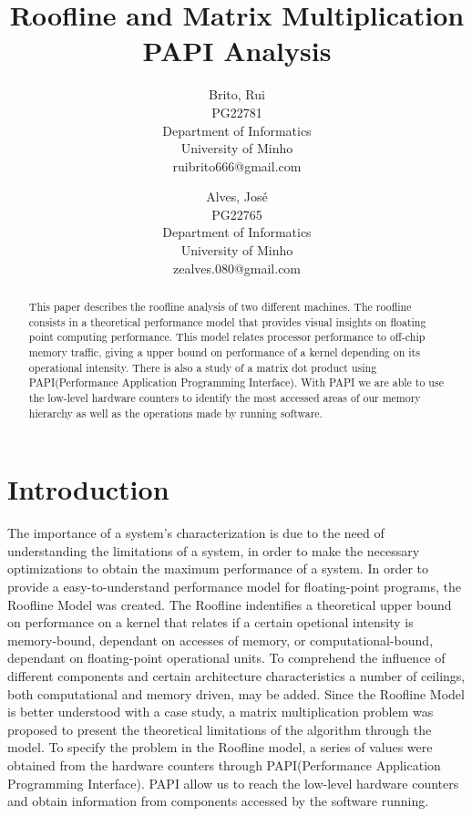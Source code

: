\documentclass[a4paper,10pt,openright,openbib,twocolumn]{article}
\begin{document}
\begin{multicols}{2}
\title{Roofline and Matrix Multiplication PAPI Analysis}
\author{
    Brito, Rui\\
    PG22781\\
    Department of Informatics\\
    University of Minho\\
    ruibrito666@gmail.com
  \and
    Alves, José\\
    PG22765\\
    Department of Informatics\\
    University of Minho\\
    zealves.080@gmail.com
}
\date{}
\maketitle
\end{multicols}

\begin{abstract}
	This paper describes the roofline\cite{roofline} analysis of two different machines. The roofline consists in a theoretical performance model that provides visual insights on floating point computing performance. This model relates processor performance to off-chip memory traffic, giving a upper bound on performance of a kernel depending on its operational intensity. There is also a study of a matrix dot product using PAPI(Performance Application Programming Interface)\cite{papi}. With PAPI we are able to use the low-level hardware counters to identify the most accessed areas of our memory hierarchy as well as the operations made by running software.  
\end{abstract}

\section{Introduction}
The importance of a system’s characterization is due to the need of understanding the limitations of a system, in order to make the necessary optimizations to obtain the maximum performance of a system. In order to provide a easy-to-understand performance model for floating-point programs, the Roofline Model was created. The Roofline indentifies a theoretical upper bound on performance on a kernel that relates if a certain opetional intensity is memory-bound, dependant on accesses of memory, or computational-bound, dependant on floating-point operational units. To comprehend the influence of different components and certain architecture characteristics a number of ceilings, both computational and memory driven, may be added. Since the Roofline Model is better understood with a case study, a matrix multiplication problem was proposed to present the theoretical limitations of the algorithm through the model. To specify the problem in the Roofline model, a series of values were obtained from the hardware counters through PAPI(Performance Application Programming Interface). PAPI allow us to reach the low-level hardware counters and obtain information from components accessed by the software running. 
\end{document}
